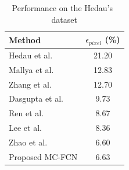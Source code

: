 \begin{table}
	\centering 
	\begin{tabular}{lc}
		\toprule
		Method & $\epsilon_{pixel}$ (\%) \\
		\midrule
		Hedau et al.~\cite{hedau2009recovering} & 21.20 \\
		Mallya et al.~\cite{mallya2015learning} & 12.83 \\
		Zhang et al.~\cite{zhang2017learning} & 12.70 \\
		Dasgupta et al.~\cite{dasgupta2016delay} & 9.73 \\
		Ren et al.~\cite{ren2016coarse} & 8.67 \\
		Lee et al.~\cite{LeeRoomNet17} & 8.36 \\
		Zhao et al.~\cite{zhao2017physics} & 6.60 \\
		\midrule
		Proposed MC-FCN & 6.63 \\
		\bottomrule
	\end{tabular}
	\caption{Performance on the Hedau's~\cite{hedau2009recovering} dataset}
	\label{table:comparison-hedau}
\end{table}




